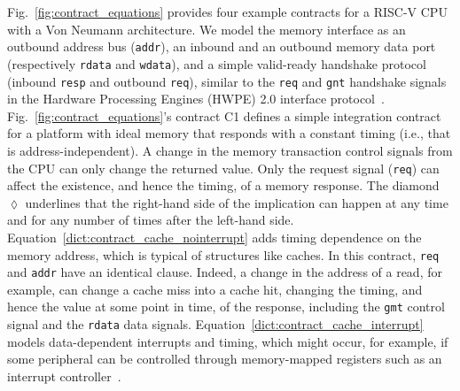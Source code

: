 Fig.~\ref{fig:contract_equations} provides four example contracts for a RISC-V CPU with a Von Neumann architecture.
We model the memory interface as an outbound address bus (\texttt{addr}), an inbound and an outbound memory data port (respectively \texttt{rdata} and \texttt{wdata}), and a simple valid-ready handshake protocol (inbound \texttt{resp} and outbound \texttt{req}), similar to the \texttt{req} and \texttt{gnt} handshake signals in the Hardware Processing Engines (HWPE) 2.0 interface protocol~\cite{pulpHWPEMem}.
Fig.~\ref{fig:contract_equations}'s contract C1 defines a simple integration contract for a platform with ideal memory that responds with a constant timing (i.e., that is address-independent).
A change in the memory transaction control signals from the CPU can only change the returned value.
Only the request signal (\texttt{req}) can affect the existence, and hence the timing, of a memory response.
The diamond $\lozenge$ underlines that the right-hand side of the implication can happen at any time and for any number of times after the left-hand side.
Equation~\ref{dict:contract_cache_nointerrupt} adds timing dependence on the memory address, which is typical of structures like caches.
In this contract, \texttt{req} and \texttt{addr} have an identical clause. Indeed, a change in the address of a read, for example, can change a cache miss into a cache hit, changing the timing, and hence the value at some point in time, of the response, including the \texttt{gmt} control signal and the \texttt{rdata} data signals.
Equation~\ref{dict:contract_cache_interrupt} models data-dependent interrupts and timing, which might occur, for example, if some peripheral can be controlled through memory-mapped registers such as an interrupt controller~\cite{riscv_plic_spec_1_0_0}.


